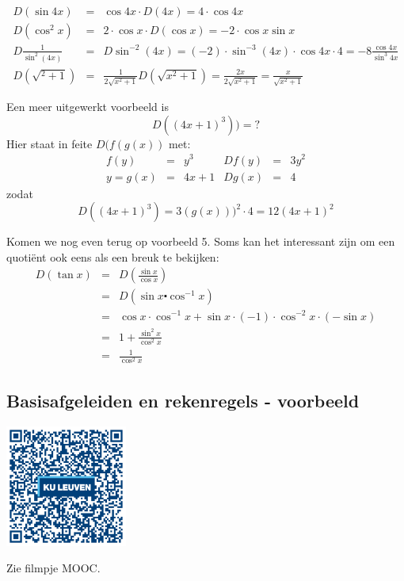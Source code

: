 \begin{voorbeeld}
\begin{eqnarray*}
D(\sin 4x) &=& \cos 4x \cdot D(4x) = 4 \cdot \cos 4x \\
D(\cos^2 x) &=& 2 \cdot \cos x \cdot D(\cos x) = -2 \cdot \cos x \sin x \\
D\frac{1}{\sin^{2}(4x)}&=&D\sin^{-2}(4x)=(-2)\cdot\sin^{-3}(4x)\cdot\cos4x\cdot4=-8\frac{\cos4x}{\sin^{3}4x} \\
D(\sqrt{^2+1}) &=& \frac{1}{2\sqrt{x^2+1}}D(\sqrt{x^2+1})=\frac{2x}{2\sqrt{x^2+1}} =\frac{x}{\sqrt{x^2+1}}
\end{eqnarray*}
\end{voorbeeld}

\begin{voorbeeld}
	Een meer uitgewerkt voorbeeld is 
	\[D((4x+1)^3))=?\]
	Hier staat in feite $D(f(g(x))$ met: 
	\[
	\begin{array}{rclrcl}
	f(y)&=&y^3 & Df(y)&=&3y^2 \\
	y=g(x)&=&4x+1 & Dg(x)&=&4 
	\end{array}
	\]
	zodat 
	\[D((4x+1)^3)=3(g(x)))^2 \cdot 4 = 12(4x+1)^2\]
\end{voorbeeld}

Komen we nog even terug op voorbeeld 5. Soms kan het interessant zijn
om een quotiënt ook eens als een breuk te bekijken:
\begin{eqnarray*}
	D\left(\tan x\right) & = & D\left(\frac{\sin x}{\cos x}\right)\\
	& = & D\left(\sin x\centerdot\cos^{-1}x\right)\\
	& = & \cos x\cdot\cos^{-1}x+\sin x\cdot(-1)\cdot\cos^{-2}x\cdot\left(-\sin x\right)\\
	& = & 1+\frac{\sin^{2}x}{\cos^{2}x}\\
	& = & \frac{1}{\cos^{2}x}
\end{eqnarray*}

\subsection{Basisafgeleiden en rekenregels - voorbeeld}
\begin{minipage}{.25\linewidth}
	\raggedright
	\includegraphics[width=4cm]{6_afgeleiden_integralen/inputs/QR_Code_BASISAFG_module6new}
\end{minipage}
\begin{minipage}{.7\linewidth}
	Zie filmpje MOOC.
\end{minipage}

